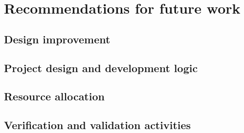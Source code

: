 \section{Recommendations for future work}\label{cha:futurework}

\subsection{Design improvement} \label{sec:improve}


\subsection{Project design and development logic} \label{sec:danddlogic}


\subsection{Resource allocation} \label{sec:resources}


\subsection{Verification and validation activities} \label{sec:futurevandv}


